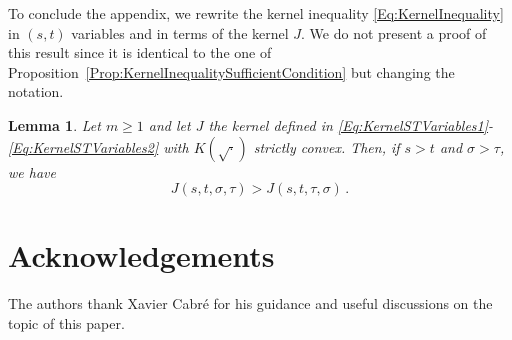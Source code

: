 \documentclass[12pt,reqno]{amsart}
\newtheorem{lemma}[theorem]{Lemma}
\theoremstyle{definition}
\theoremstyle{remark}
\numberwithin{equation}{section}
\begin{document}
	To conclude the appendix, we rewrite the kernel inequality \eqref{Eq:KernelInequality} in $(s,t)$ variables and in terms of the kernel $J$. We do not present a proof of this result since it is identical to the one of Proposition~\ref{Prop:KernelInequalitySufficientCondition} but changing the notation.
	
	\begin{lemma}
		\label{Lemma:KernelInequalityCone} Let $m\geq 1$ and let $J$ the kernel defined in
		\eqref{Eq:KernelSTVariables1}-\eqref{Eq:KernelSTVariables2} with $K(\sqrt{\cdot})$ strictly convex. Then, if $s>t$ and $\sigma > \tau$, we have
		\begin{equation*}
		J(s,t,\sigma, \tau) > J(s,t,\tau, \sigma)\,.
		\end{equation*}
	\end{lemma}
	
	
	\section*{Acknowledgements}
	The authors thank Xavier Cabré for his guidance and useful discussions on the topic of this paper.
	
	
	
	
\end{document}
